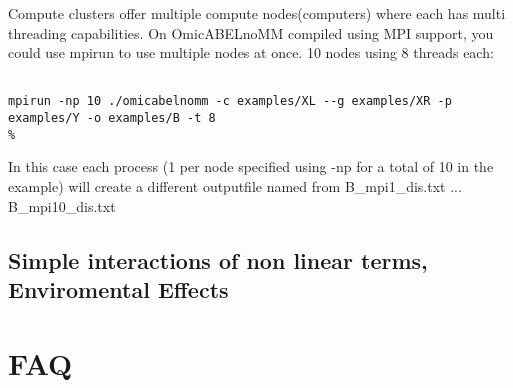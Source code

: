 \documentclass{report}
\begin{document}
Compute clusters offer multiple compute nodes(computers) where each has multi threading capabilities. On OmicABELnoMM compiled using MPI support, you could use mpirun to use multiple nodes at once. 10 nodes using 8 threads each:

\begin{lstlisting}[style=BASH,escapechar=\%]

mpirun -np 10 ./omicabelnomm -c examples/XL --g examples/XR -p examples/Y -o examples/B -t 8
%
\end{lstlisting}

In this case each process (1 per node specified using -np for a total of 10 in the example) will create a different outputfile named from B\_mpi1\_dis.txt ... B\_mpi10\_dis.txt


\section{Simple interactions of non linear terms, Enviromental Effects}



\chapter{FAQ}
\end{document}
